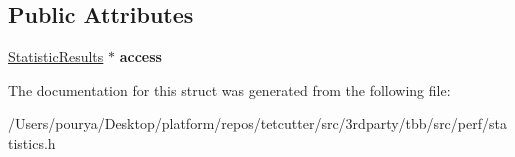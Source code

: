 \subsection*{Public Attributes}
\begin{DoxyCompactItemize}
\item 
\hypertarget{structStatisticsCollector_1_1TestCase_a1a5c9ab67ec350c1cb601f5934167c63}{}\hyperlink{structStatisticsCollector_1_1StatisticResults}{Statistic\+Results} $\ast$ {\bfseries access}\label{structStatisticsCollector_1_1TestCase_a1a5c9ab67ec350c1cb601f5934167c63}

\end{DoxyCompactItemize}


The documentation for this struct was generated from the following file\+:\begin{DoxyCompactItemize}
\item 
/\+Users/pourya/\+Desktop/platform/repos/tetcutter/src/3rdparty/tbb/src/perf/statistics.\+h\end{DoxyCompactItemize}
